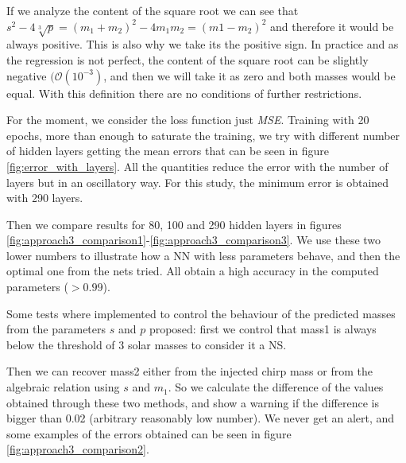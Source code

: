 \documentclass[prd,aps,twocolumn,a4paper,showkeys,nofootinbib]{revtex4-1}
\begin{document}
If we analyze the content of the square root we can see that $s^2-4\sqrt[3]{p}=(m_1+m_2)^2-4m_1m_2=(m1-m_2)^2$ and therefore it would be always positive. This is also why we take its the positive sign. In practice and as the regression is not perfect, the content of the square root can be slightly negative $(\mathcal{O}(10^{-3})$, and then we will take it as zero and both masses would be equal. With this definition there are no conditions of further restrictions.

For the moment, we consider the loss function just \textit{MSE}. Training with 20 epochs, more than enough to saturate the training, we try with different number of hidden layers getting the mean errors that can be seen in figure \ref{fig:error_with_layers}. All the quantities reduce the error with the number of layers but in an oscillatory way. For this study, the minimum error is obtained with 290 layers.

Then we compare results for 80, 100 and 290 hidden layers in figures  \ref{fig:approach3_comparison1}-\ref{fig:approach3_comparison3}. We use these two lower numbers to illustrate how a NN with less parameters behave, and then the optimal one from the nets tried. All  obtain a high accuracy in the computed parameters ($>0.99$). 

Some tests where implemented to control the behaviour of the predicted masses from the parameters $s$ and $p$ proposed: first we control that mass1 is always below the threshold of 3 solar masses to consider it a NS. 

Then we can recover mass2 either from the injected chirp mass or from the algebraic relation using $s$ and $m_1$. So we calculate the difference of the values obtained through these two methods, and show a warning if the difference is bigger than 0.02 (arbitrary reasonably low number). We never get an alert, and some examples of the errors obtained can be seen in figure \ref{fig:approach3_comparison2}.
\end{document}
